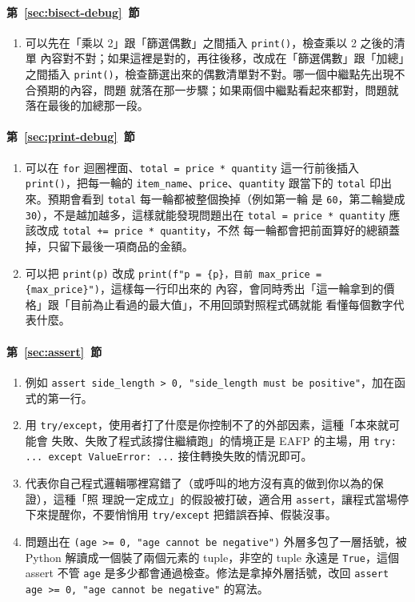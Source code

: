 \paragraph{第~\ref{sec:bisect-debug}~節}
\begin{enumerate}
\item 可以先在「乘以 2」跟「篩選偶數」之間插入 \texttt{print()}，檢查乘以 2 之後的清單
內容對不對；如果這裡是對的，再往後移，改成在「篩選偶數」跟「加總」之間插入
\texttt{print()}，檢查篩選出來的偶數清單對不對。哪一個中繼點先出現不合預期的內容，問題
就落在那一步驟；如果兩個中繼點看起來都對，問題就落在最後的加總那一段。
\end{enumerate}

\paragraph{第~\ref{sec:print-debug}~節}
\begin{enumerate}
\item 可以在 \texttt{for} 迴圈裡面、\texttt{total = price * quantity} 這一行前後插入
\texttt{print()}，把每一輪的 \texttt{item\_name}、\texttt{price}、\texttt{quantity}
跟當下的 \texttt{total} 印出來。預期會看到 \texttt{total} 每一輪都被整個換掉（例如第一輪
是 \texttt{60}，第二輪變成 \texttt{30}），不是越加越多，這樣就能發現問題出在
\texttt{total = price * quantity} 應該改成 \texttt{total += price * quantity}，不然
每一輪都會把前面算好的總額蓋掉，只留下最後一項商品的金額。
\item 可以把 \texttt{print(p)} 改成
\texttt{print(f"p = \{p\}，目前 max\_price = \{max\_price\}")}，這樣每一行印出來的
內容，會同時秀出「這一輪拿到的價格」跟「目前為止看過的最大值」，不用回頭對照程式碼就能
看懂每個數字代表什麼。
\end{enumerate}

\paragraph{第~\ref{sec:assert}~節}
\begin{enumerate}
\item 例如 \texttt{assert side\_length > 0, "side\_length must be positive"}，加在函式的第一行。
\item 用 \texttt{try/except}，使用者打了什麼是你控制不了的外部因素，這種「本來就可能會
失敗、失敗了程式該撐住繼續跑」的情境正是 EAFP 的主場，用
\texttt{try: ... except ValueError: ...} 接住轉換失敗的情況即可。
\item 代表你自己程式邏輯哪裡寫錯了（或呼叫的地方沒有真的做到你以為的保證），這種「照
理說一定成立」的假設被打破，適合用 \texttt{assert}，讓程式當場停下來提醒你，不要悄悄用
\texttt{try/except} 把錯誤吞掉、假裝沒事。
\item 問題出在 \texttt{(age >= 0, "age cannot be negative")} 外層多包了一層括號，被 Python
解讀成一個裝了兩個元素的 tuple，非空的 tuple 永遠是 \texttt{True}，這個 assert 不管
\texttt{age} 是多少都會通過檢查。修法是拿掉外層括號，改回
\texttt{assert age >= 0, "age cannot be negative"} 的寫法。
\end{enumerate}
